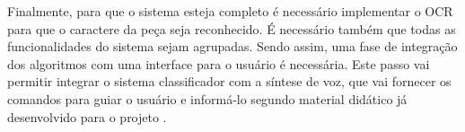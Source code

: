 Finalmente, para que o sistema esteja completo é necessário implementar o OCR para que o caractere da peça seja reconhecido. É necessário também que todas as funcionalidades do sistema sejam agrupadas. Sendo assim, uma fase de integração dos algoritmos com uma interface para o usuário é necessária. Este passo vai permitir integrar o sistema classificador com a síntese de voz, que vai fornecer os comandos para guiar o usuário e informá-lo segundo material didático já desenvolvido para o projeto .


